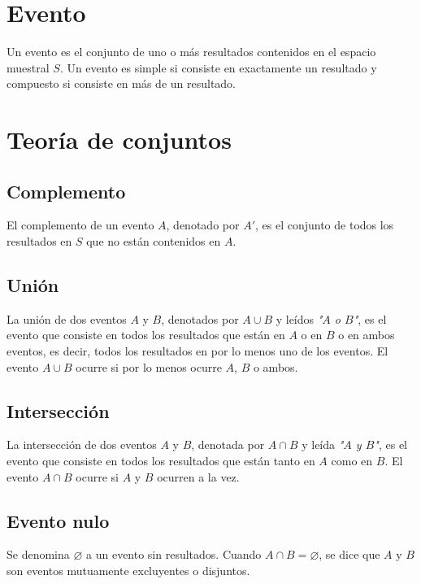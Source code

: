 \documentclass{report}
\begin{document}
    \section*{Evento}
    Un evento es el conjunto de uno o más resultados contenidos en el espacio 
    muestral $S$. Un evento es simple si consiste en exactamente un resultado y 
    compuesto si consiste en más de un resultado.

    \section*{Teoría de conjuntos}

      \subsection*{Complemento}
      El complemento de un evento $A$, denotado por $A'$, es el conjunto de todos los 
      resultados en $S$ que no están contenidos en $A$. 

      \subsection*{Unión}
      La unión de dos eventos $A$ y $B$, denotados por $A\cup B$ y leídos \textit{"$A$ o $B$"}, 
      es el evento que consiste en todos los resultados que están en $A$ o en $B$ 
      o en ambos eventos, es decir, todos  los resultados en por lo menos uno de 
      los eventos. El evento $A\cup B$ ocurre si por lo menos ocurre $A$, $B$ 
      o ambos.


      \subsection*{Intersección}
      La intersección de dos eventos $A$ y $B$, denotada por $A\cap B$ y leída 
      \textit{"$A$ y $B$"}, es el evento que consiste en todos los resultados 
      que están tanto en $A$ como en $B$. El evento $A\cap B$ ocurre si $A$ y
      $B$ ocurren a la vez.

      \subsection*{Evento nulo}
      Se denomina $\varnothing$ a un evento sin resultados. Cuando $A\cap B=\varnothing$, se dice que 
      $A$ y $B$ son eventos mutuamente excluyentes o disjuntos.
\end{document}
